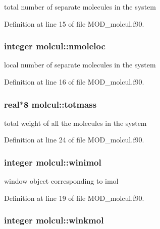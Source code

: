 total number of separate molecules in the system 



Definition at line 15 of file M\-O\-D\-\_\-molcul.\-f90.

\hypertarget{classmolcul_a7f367e6c4c29a8349ee56c6a9a57f627}{
\subsubsection[{nmoleloc}]{\setlength{\rightskip}{0pt plus 5cm}integer molcul\-::nmoleloc}}\label{classmolcul_a7f367e6c4c29a8349ee56c6a9a57f627}


local number of separate molecules in the system 



Definition at line 16 of file M\-O\-D\-\_\-molcul.\-f90.

\hypertarget{classmolcul_a76ebf02e788b2fc31b96c58c63d07222}{
\subsubsection[{totmass}]{\setlength{\rightskip}{0pt plus 5cm}real$\ast$8 molcul\-::totmass}}\label{classmolcul_a76ebf02e788b2fc31b96c58c63d07222}


total weight of all the molecules in the system 



Definition at line 24 of file M\-O\-D\-\_\-molcul.\-f90.

\hypertarget{classmolcul_a7f2c0c497b9a26ac237be07ca2b484f7}{
\subsubsection[{winimol}]{\setlength{\rightskip}{0pt plus 5cm}integer molcul\-::winimol}}\label{classmolcul_a7f2c0c497b9a26ac237be07ca2b484f7}


window object corresponding to imol 



Definition at line 19 of file M\-O\-D\-\_\-molcul.\-f90.

\hypertarget{classmolcul_a3d4317cc7eda6c46c437b0a7ebf01903}{
\subsubsection[{winkmol}]{\setlength{\rightskip}{0pt plus 5cm}integer molcul\-::winkmol}}\label{classmolcul_a3d4317cc7eda6c46c437b0a7ebf01903}


